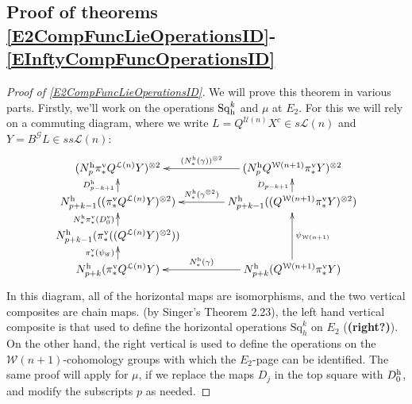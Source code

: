 \documentclass[11pt]{amsart}
\theoremstyle{plain}
\theoremstyle{definition}
\newcommand{\scrG}{\mathscr{G}}
\newcommand{\calW}{\mathcal{W}}
\newcommand{\calU}{\mathcal{U}}
\newcommand{\calL}{\mathcal{L}}
\theoremstyle{plain}
\newcommand{\BSW}{{\scrG}}
\newcommand{\BSWres}{B^\BSW}%
\newcommand{\Sq}{\mathrm{Sq}}
\newcommand{\Sqh}{\mathrm{Sq}_\textup{h}}
\begin{document}
\begin{Operations in composite functor spectral sequences}
\subsection{Proof of theorems \ref{E2CompFuncLieOperationsID}-\ref{EInftyCompFuncOperationsID}}

\begin{proof}[Proof of \ref{E2CompFuncLieOperationsID}]
We will prove this theorem in various parts. Firstly, we'll work on the operations $\Sqh^k$ and $\mu$ at $E_2$.
For this we will rely on a commuting diagram, where we write $L=Q^{\calU(n)}X^c\in s\calL(n)$ and $Y=\BSWres L\in ss\calL(n)$:
\[\xymatrix@C=13mm@R=4mm{
(N_p^\textup{h}\pi_*^{\textup{v}}Q^{\calL(n)}Y)^{\otimes2}&%
(N_p^\textup{h}Q^{\calW(n+1)}\pi_*^{\textup{v}}Y)^{\otimes2}
\ar[l]_-{(N^\textup{h}_*(\gamma))^{\otimes 2}}
\\%
N_{p+k-1}^\textup{h}((\pi_*^{\textup{v}}Q^{\calL(n)}Y)^{\otimes2})
\ar[u]^-{D_{p-k+1}^\textup{h}}
&%
N_{p+k-1}^\textup{h}((Q^{\calW(n+1)}\pi_*^{\textup{v}}Y)^{\otimes2})
\ar[u]^-{D_{p-k+1}}
\ar[l]_-{N^\textup{h}_*(\gamma^{\otimes 2})}
\\%
N_{p+k-1}^\textup{h}(\pi_*^{\textup{v}}((Q^{\calL(n)}Y)^{\otimes2}))
\ar[u]^-{N^\textup{h}_*\pi_*^\textup{v}(D_0^\textup{v})}
&%
\\%
N^\textup{h}_{p+k}(\pi_*^{\textup{v}} Q^{\calL(n)}Y)
\ar[u]^-{\pi_*^\textup{v}(\psi_{\BSW})}
&%
N^\textup{h}_{p+k}(Q^{\calW(n+1)}\pi_*^{\textup{v}} Y)
\ar[uu]_-{\psi_{\calW(n+1)}}
\ar[l]_-{N^\textup{h}_*(\gamma)}
}\]
In this diagram, all of the horizontal maps are isomorphisms, and the two vertical composites are chain maps. (by Singer's Theorem 2.23),  the left hand vertical composite is that used to define the horizontal operations $\Sq^{k}_h$ on $E_2$ (\textbf{(right?)}). On the other hand, the right vertical is used to define the operations on the $\calW(n+1)$-cohomology groups with which the $E_2$-page can be identified. The same proof will apply for $\mu$, if we replace the maps $D_j$ in the top square with $D_0^\textup{h}$, and modify the subscripts $p$ as needed.


\end{proof}
\end{Operations in composite functor spectral sequences}
\end{document}

